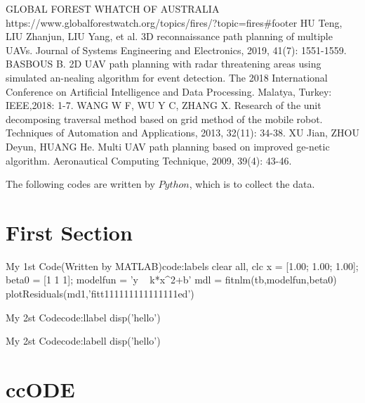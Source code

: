 \clearpage   %
\begin{thebibliography}{99}
     GLOBAL FOREST WHATCH OF AUSTRALIA \\https://www.globalforestwatch.org/topics/fires/?topic=fires\#footer
	 HU Teng, LIU Zhanjun, LIU Yang, et al. 3D reconnaissance path planning of multiple UAVs. Journal of Systems Engineering and Electronics, 2019, 41(7): 1551-1559.
	 BASBOUS B. 2D UAV path planning with radar threatening areas using simulated an-nealing algorithm for event detection. The 2018 International Conference on Artificial Intelligence and Data Processing. Malatya, Turkey: IEEE,2018: 1-7.
	 WANG W F, WU Y C, ZHANG X. Research of the unit decomposing traversal method based on grid method of the mobile robot. Techniques of Automation and Applications, 2013, 32(11): 34-38.
	 XU Jian, ZHOU Deyun, HUANG He. Multi UAV path planning based on improved ge-netic algorithm. Aeronautical Computing Technique, 2009, 39(4): 43-46.
\end{thebibliography}
\textbf{}The following codes are written by $Python$, which is to collect the data.
\appendix

\section{First Section}
\begin{matlab}{My 1st Code(Written by MATLAB)}{code:labels}
clear all, clc
x = [1.00; 1.00; 1.00];
beta0 = [1 1 1];
modelfun = 'y ~ k*x^2+b'
mdl = fitnlm(tb,modelfun,beta0)
plotResiduals(md1,'fitt111111111111111ed')




\end{matlab}
\begin{matlab}{My 2st Code}{code:llabel}
disp('hello')
\end{matlab}
\begin{matlab}{My 2st Code}{code:labell}
    disp('hello')
\end{matlab}
\section{ccODE}
